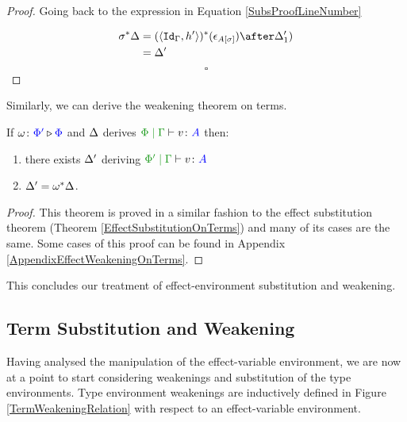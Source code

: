 \documentclass{Report}
\begin{document}
\begin{framed}
\begin{proof}
    Going back to the expression in Equation \ref{SubsProofLineNumber}
    
    \begin{align*}
        \si\star{\D} & = (\pr{\Id{\G}}{h'})\star(\e_{A\ssi})\after\D_1')\\
        & = \D'
    \end{align*}
    $$\square$$
    \end{proof}
    
\end{framed}

Similarly, we can derive the weakening theorem on terms.


\begin{framed}
    \begin{theorem}\label{EffectWeakeningOnTerms}
        If $\omega \colon {\color{blue}\Phi'} \triangleright {\color {blue} \Phi}$ and $\Delta$ derives $\gpetyperelation{v}{A}$ then:
        \begin{enumerate}[label=\roman*.]
            \item there exists $\Delta'$ deriving $\etyperelation{\P'}{\G}{v}{A}$ 
            \item $\Delta' = \omega^*\Delta$.
        \end{enumerate}
    \end{theorem}
    
    \begin{proof}
        This theorem is proved in a similar fashion to the effect substitution theorem (Theorem \ref{EffectSubstitutionOnTerms}) and many of its cases are the same. Some cases of this proof can be found in Appendix \ref{AppendixEffectWeakeningOnTerms}.
    \end{proof}
\end{framed}

This concludes our treatment of effect-environment substitution and weakening.

\subsection{Term Substitution and Weakening}

Having analysed the manipulation of the effect-variable environment, we are now at a point to start considering weakenings and substitution of the type environments. Type environment weakenings are inductively defined in Figure \ref{TermWeakeningRelation} with respect to an effect-variable environment.
\end{document}
